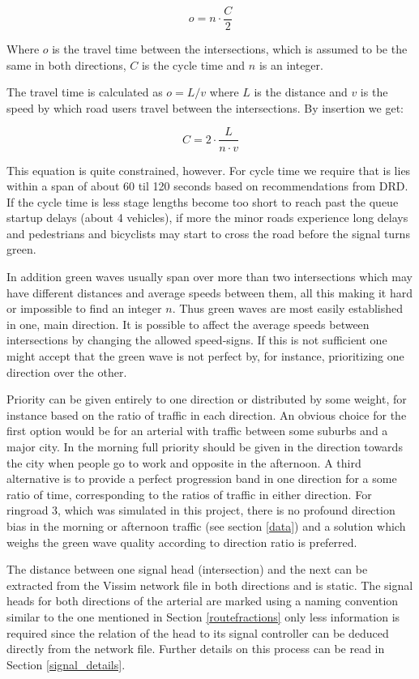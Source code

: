 $$o = n \cdot \frac{C}{2}$$

Where $o$ is the travel time between the intersections, which is assumed to be the same in both directions, $C$ is the cycle time and $n$ is an integer.

The travel time is calculated as $o = L / v$ where $L$ is the distance and $v$ is the speed by which road users travel between the intersections. By insertion we get:

$$C = 2 \cdot \frac{L}{n \cdot v}$$

This equation is quite constrained, however. For cycle time we require that is lies within a span of about 60 til 120 seconds based on recommendations from DRD. If the cycle time is less stage lengths become too short to reach past the queue startup delays (about 4 vehicles), if more the minor roads experience long delays and pedestrians and bicyclists may start to cross the road before the signal turns green.

In addition green waves usually span over more than two intersections which may have different distances and average speeds between them, all this making it hard or impossible to find an integer $n$. Thus green waves are most easily established in one, main direction. It is possible to affect the average speeds between intersections by changing the allowed speed-signs. If this is not sufficient one might accept that the green wave is not perfect by, for instance, prioritizing one direction over the other.

Priority can be given entirely to one direction or distributed by some weight, for instance based on the ratio of traffic in each direction. An obvious choice for the first option would be for an arterial with traffic between some suburbs and a major city. In the morning full priority should be given in the direction towards the city when people go to work and opposite in the afternoon. A third alternative is to provide a perfect progression band in one direction for a some ratio of time, corresponding to the ratios of traffic in either direction.
For ringroad 3, which was simulated in this project, there is no profound direction bias in the morning or afternoon traffic (see section \ref{data}) and a solution which weighs the green wave quality according to direction ratio is preferred. 

The distance between one signal head (intersection) and the next can be extracted from the Vissim network file in both directions and is static. The signal heads for both directions of the arterial are marked using a naming convention similar to the one mentioned in Section \ref{routefractions} only less information is required since the relation of the head to its signal controller can be deduced directly from the network file. Further details on this process can be read in Section \ref{signal_details}.

